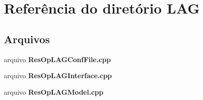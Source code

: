 \section{Referência do diretório L\+AG}
\label{dir_c9f2895c0a5e34ca4b1002fa9a6fd9d3}
\subsection*{Arquivos}
\begin{DoxyCompactItemize}
\item 
arquivo {\bf Res\+Op\+L\+A\+G\+Conf\+File.\+cpp}
\item 
arquivo {\bf Res\+Op\+L\+A\+G\+Interface.\+cpp}
\item 
arquivo {\bf Res\+Op\+L\+A\+G\+Model.\+cpp}
\end{DoxyCompactItemize}
